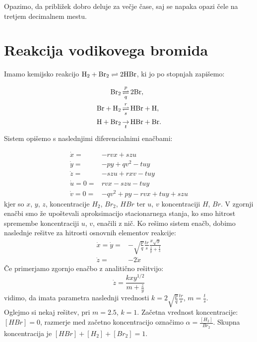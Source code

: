 \documentclass[slovene,11pt,a4paper]{article}
\numberwithin{equation}{section} %
\numberwithin{figure}{section} %
\numberwithin{table}{section} %
\begin{document}
Opazimo, da približek dobro deluje za večje čase, saj se napaka opazi čele na tretjem decimalnem mestu.

\section{Reakcija vodikovega bromida}
Imamo kemijsko reakcijo ${\rm H}_2+{\rm Br}_2\rightleftharpoons 2{\rm HBr}$, ki jo po stopnjah zapišemo:

  \begin{align*}
    {\rm Br}_2 & \mathop{\rightleftharpoons}_{q}^{p} 2{\rm Br},\\
    {\rm Br}+{\rm H}_2 &\mathop{\rightleftharpoons}_{s}^{r} {\rm H Br}+{\rm H},\\
    {\rm H}+{\rm Br}_2 &\mathop{\rightarrow}_{t} {\rm H Br}+{\rm Br}.
  \end{align*}
Sistem opišemo s naslednjimi diferencialnimi enačbami:

\begin{equation}
\begin{aligned}
\dot{x}=& -rvx + szu \\
\dot{y}=& -py + q v^2 -t u y \\
\dot{z}=& -s z u + r x v -t u y \\
\dot{u}=0=& r v x - s z u - t u y \\
\dot{v}=0=& -q v^2 + p y -r v x + t u y + s z u
\end{aligned}
\end{equation}
kjer so $x$, $y$, $z$, koncentracije $H_2$, $Br_2$, $HBr$ ter $u$, $v$ koncentraciji $H$, $Br$. V zgornji enačbi smo že upoštevali aproksimacijo stacionarnega stanja, ko smo hitrost spremembe koncentraciji $u$, $v$, enačili z nič. Ko rešimo sistem enačb, dobimo naslednje rešitve za hitrosti osnovnih elementov reakcije:
\begin{equation}
\begin{aligned}
\dot{x}= \dot{y}=& - \sqrt{\frac{p}{q}}  \frac{t r }{s } \frac{x \sqrt{y}}{\frac{z}{y}+ \frac{t}{s}} \\
\dot{z}=& -2 \dot{x}
\end{aligned}
\end{equation}
Če primerjamo zgornjo enačbo z analitično rešitvijo:
\begin{equation*}
\dot{z}=\frac{k x y^{1/2}}{m+\frac{z}{y}}
\end{equation*}
vidimo, da imata parametra naslednji vrednosti $k=2\sqrt{\frac{p}{q}}  \frac{t r }{s }$, $m=\frac{t}{s}$.\\
Oglejmo si nekaj rešitev, pri $m=2.5$, $k=1$. Začetna vrednost koncentracije: $[HBr]=0$, razmerje med začetno koncentracijo označimo $\alpha=\frac{[H_2]}{Br_2}$. Skupna koncentracija je $[HBr]+[H_2]+[Br_2]=1$.
\end{document}
